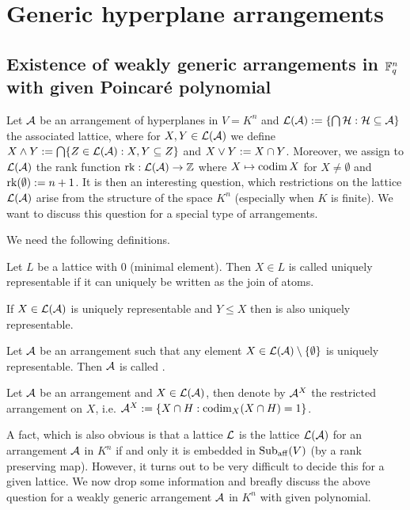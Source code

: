 \section{Generic hyperplane arrangements}

\subsection{Existence of weakly generic arrangements in $\mathbb{F}_{q}^n$ with given Poincaré polynomial}

Let $\mathcal{A}$ be an arrangement of hyperplanes in $V=K^n$ and $\mathcal{L}(\mathcal{A}):=\{\bigcap \mathcal{H}:\mathcal{H}\subseteq \mathcal{A}\}$ the associated lattice, where for $X,Y\in\mathcal{L}(\mathcal{A})$ we define $X\wedge Y:=\bigcap\{Z\in\mathcal{L}(\mathcal{A}):X,Y\subseteq Z\}$ and $X\vee Y:= X\cap Y$.
Moreover, we assign to $\mathcal{L}(\mathcal{A})$ the rank function $\mathop\mathrm{rk}:\mathcal{L}(\mathcal{A})\rightarrow \mathbb{Z}$ where $X\mapsto \mathop\mathrm{codim} X$ for $X\neq \emptyset$ and $\mathop\mathrm{rk}(\emptyset):=n+1$.
It is then an interesting question, which restrictions on the lattice $\mathcal{L}(\mathcal{A})$ arise from the structure of the space $K^n$ (especially when $K$ is finite). We want to discuss this question for a special type of arrangements.

We need the following definitions.

\begin{definition} 
    Let $L$ be a lattice with $0$ (minimal element). Then $X\in L$ is called uniquely representable if it can uniquely be written as the join of atoms.
\end{definition}

\begin{remark}
    If $X\in\mathcal{L}(\mathcal{A})$ is uniquely representable and $Y\leq X$ then is also uniquely representable. 
\end{remark}

\begin{definition}
    Let $\mathcal{A}$ be an arrangement such that any element $X\in\cL(\cA)\setminus\set{\emptyset}$ is uniquely representable. Then $\mathcal{A}$ is called .
\end{definition}

\begin{definition}
    Let $\mathcal{A}$ be an arrangement and $X\in\mathcal{L}(\mathcal{A})$, then denote by $\mathcal{A}^X$ the restricted arrangement on $X$, i.e. $\cA^X:=\set{X\setmeet H:\codim_X(X\setmeet H)=1}$.
\end{definition}

A fact, which is also obvious is that a lattice $\mathcal{L}$ is the lattice $\mathcal{L}(\mathcal{A})$ for an arrangement $\mathcal{A}$ in $K^n$ if and only it is embedded in $\mathop\mathrm{Sub}\nolimits_{\mathop\mathrm{aff}}(V)$ (by a rank preserving map). However, it turns out to be very difficult to decide this for a given lattice.
We now drop some information and breafly discuss the above question for a weakly generic arrangement $\mathcal{A}$ in $K^n$ with given  polynomial.


